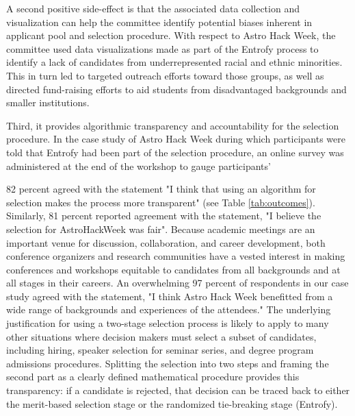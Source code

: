 \documentclass[10pt,letterpaper]{article}
\begin{document}
A second positive side-effect is that the associated data collection and visualization can help the committee identify potential biases inherent in applicant pool and selection procedure.
With respect to Astro Hack Week, the committee used data visualizations made as part of the Entrofy process to identify a lack of candidates from underrepresented racial and ethnic minorities.
This in turn led to targeted outreach efforts toward those groups, as well as directed fund-raising efforts to aid students from disadvantaged backgrounds and smaller institutions.  

Third, it provides algorithmic transparency and accountability for the selection procedure. In the case study of Astro Hack Week during which participants were told that Entrofy had been part of the selection procedure, an online survey was administered at the end of the workshop to gauge participants' 

82 percent agreed with the statement "I think that using an algorithm for selection makes the process more transparent" (see Table \ref{tab:outcomes}). Similarly, 81 percent reported agreement with the statement, "I believe the selection for AstroHackWeek was fair". Because academic meetings are an important venue for discussion, collaboration, and career development, both conference organizers and research communities have a vested interest in making conferences and workshops equitable to candidates from all backgrounds and at all stages in their careers. An overwhelming 97 percent of respondents in our case study agreed with the statement, "I think Astro Hack Week benefitted from a wide range of backgrounds and experiences of the attendees."
The underlying justification for using a two-stage selection process is likely to apply to many other situations where decision makers must select a subset of candidates, including hiring, speaker selection for seminar series, and degree program admissions procedures.
Splitting the selection into two steps and framing the second part as a clearly defined mathematical procedure provides this transparency: if a candidate is rejected, that decision can be traced back to either the merit-based selection stage or the randomized tie-breaking stage (Entrofy).
\end{document}
